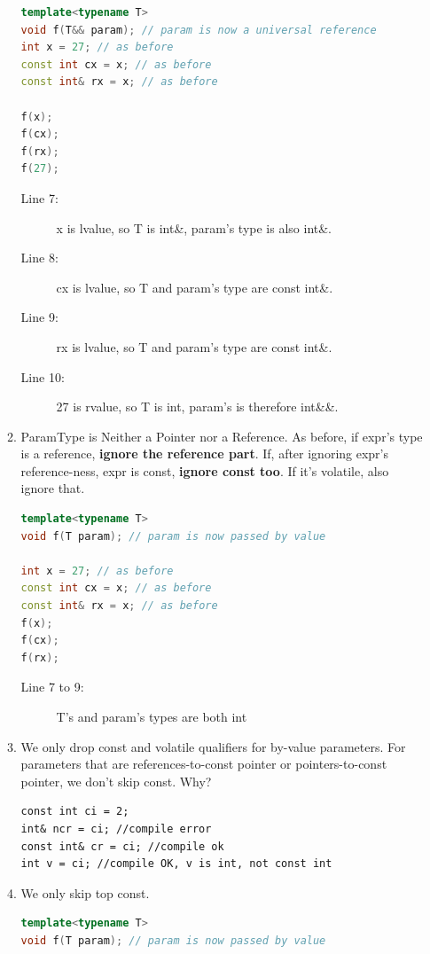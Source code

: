 \documentclass[a4paper,11pt,twoside]{book}
\begin{document}
\begin{itemize}
\begin{enumerate}
\begin{lstlisting}[frame=single, language=c++]
template<typename T>
void f(T&& param); // param is now a universal reference
int x = 27; // as before
const int cx = x; // as before
const int& rx = x; // as before
	
f(x); 
f(cx); 
f(rx); 
f(27); 
\end{lstlisting}
\begin{description}
	\item[Line 7:]  x is lvalue, so T is int\&, param's type is also int\&.
	\item[Line 8:]  cx is lvalue, so T  and param's type are const int\&.
	\item[Line 9:] rx is lvalue, so T  and param's type are const int\&.
	\item[Line 10:] 27 is rvalue, so T is int, param's is therefore int\&\&.
\end{description}
	
	\item ParamType is Neither a Pointer nor a Reference. As before, if expr's type is a reference, \textbf{ignore the reference part}. If, after ignoring expr's reference-ness, expr is const, \textbf{ignore const too}. If it's volatile, also ignore that.
\begin{lstlisting}[frame=single, language=c++]
template<typename T>
void f(T param); // param is now passed by value
	
int x = 27; // as before
const int cx = x; // as before
const int& rx = x; // as before
f(x); 
f(cx); 
f(rx); 
\end{lstlisting}
\begin{description}
	\item[Line 7 to 9:] T's and param's types are both int
\end{description}
	
	\item We only drop const and volatile qualifiers for by-value parameters. For parameters that are references-to-const pointer or pointers-to-const pointer, we don't skip const. Why?
\begin{lstlisting}
const int ci = 2;
int& ncr = ci; //compile error
const int& cr = ci; //compile ok
int v = ci; //compile OK, v is int, not const int
\end{lstlisting}
	
	\item We only skip top const. 
\begin{lstlisting}[frame=single, language=c++]
template<typename T>
void f(T param); // param is now passed by value
	

\end{lstlisting}
\end{enumerate}
\end{itemize}
\end{document}
